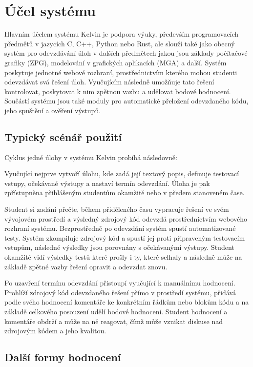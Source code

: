 \section{Účel systému}
\label{sec:kelvin-purpose}

Hlavním účelem systému Kelvin je podpora výuky, především programovacích předmětů v jazycích C, C++, Python nebo Rust, ale slouží také jako obecný systém pro odevzdávání úloh v dalších předmětech jakou jsou základy počítačové grafiky (ZPG), modelování v grafických aplikacích (MGA) a další.
Systém poskytuje jednotné webové rozhraní, prostřednictvím kterého mohou studenti odevzdávat svá řešení úloh.
Vyučujícím následně umožňuje tato řešení kontrolovat, poskytovat k nim zpětnou vazbu a udělovat bodové hodnocení.
Součástí systému jsou také moduly pro automatické přeložení odevzdaného kódu, jeho spuštění a ověření výstupů.

\subsection{Typický scénář použití}
\label{subsec:kelvin-workflow}

Cyklus jedné úlohy v systému Kelvin probíhá následovně:

Vyučující nejprve vytvoří úlohu, kde zadá její textový popis, definuje testovací vstupy, očekávané výstupy a nastaví termín odevzdání.
Úloha je pak zpřístupněna přihlášeným studentům okamžitě nebo v předem stanoveném čase.

Student si zadání přečte, během přiděleného času vypracuje řešení ve svém vývojovém prostředí a výsledný zdrojový kód odevzdá prostřednictvím webového rozhraní systému.
Bezprostředně po odevzdání systém spustí automatizované testy.
Systém zkompiluje zdrojový kód a spustí jej proti připraveným testovacím vstupům, následné výsledky jsou porovnány s očekávanými výstupy.
Student okamžitě vidí výsledky testů které prošly i ty, které selhaly a následně může na základě zpětné vazby řešení opravit a odevzdat znovu.

Po uzavření termínu odevzdání přistoupí vyučující k manuálnímu hodnocení.
Prohlíží zdrojový kód odevzdaného řešení přímo v prostředí systému, přidává podle svého hodnocení komentáře ke konkrétním řádkům nebo blokům kódu a na základě celkového posouzení udělí bodové hodnocení.
Student hodnocení a komentáře obdrží a může na ně reagovat, čímž může vznikat diskuse nad zdrojovým kódem a jeho kvalitou.

\subsection{Další formy hodnocení}
\label{subsec:kelvin-other-assessments}

